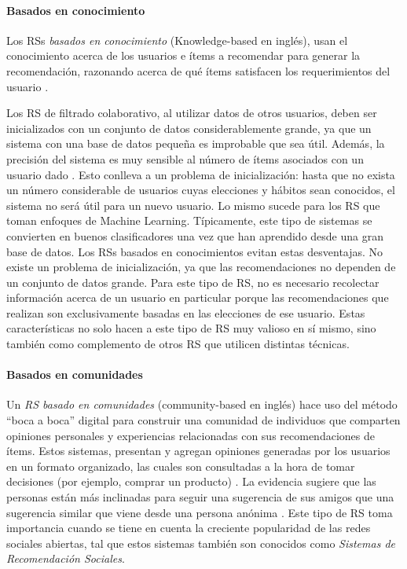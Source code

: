\paragraph{Basados en conocimiento}
Los RSs \textit{basados en conocimiento} (Knowledge-based en inglés), usan el conocimiento acerca de los usuarios e ítems a recomendar para generar la recomendación, razonando acerca de qué ítems satisfacen los requerimientos del usuario \citep{burke2000knowledge}.

\bigskip Los RS de filtrado colaborativo, al utilizar datos de otros usuarios, deben ser inicializados con un conjunto de datos considerablemente grande, ya que un sistema con una base de datos pequeña es improbable que sea útil. Además, la precisión del sistema es muy sensible al número de ítems asociados con un usuario dado \citep{shardanand1995social}. Esto conlleva a un problema de inicialización: hasta que no exista un número considerable de usuarios cuyas elecciones y hábitos sean conocidos, el sistema no será útil para un nuevo usuario. Lo mismo sucede para los RS que toman enfoques de Machine Learning. Típicamente, este tipo de sistemas se convierten en buenos clasificadores una vez que han aprendido desde una gran base de datos. Los RSs basados en conocimientos evitan estas desventajas. No existe un problema de inicialización, ya que las recomendaciones no dependen de un conjunto de datos grande. Para este tipo de RS, no es necesario recolectar información acerca de un usuario en particular porque las recomendaciones que realizan son exclusivamente basadas en las elecciones de ese usuario. Estas características no solo hacen a este tipo de RS muy valioso en sí mismo, sino también como complemento de otros RS que utilicen distintas técnicas.

\paragraph{Basados en comunidades}
Un \textit{RS basado en comunidades} (community-based en inglés) hace uso del método “boca a boca” digital para construir una comunidad de individuos que comparten opiniones personales y experiencias relacionadas con sus recomendaciones de ítems. Estos sistemas, presentan y agregan opiniones generadas por los usuarios en un formato organizado, las cuales son consultadas a la hora de tomar decisiones (por ejemplo, comprar un producto) \citep{chen2009community}. La evidencia sugiere que las personas están más inclinadas para seguir una sugerencia de sus amigos que una sugerencia similar que viene desde una persona anónima \citep{sinha2001comparing}. Este tipo de RS toma importancia cuando se tiene en cuenta la creciente popularidad de las redes sociales abiertas, tal que estos sistemas también son conocidos como \textit{Sistemas de Recomendación Sociales}.

